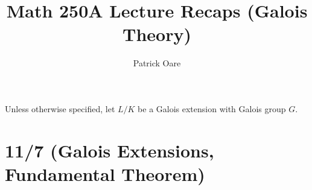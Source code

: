 \documentclass[11pt, oneside]{amsart}   	%
\title{Math 250A Lecture Recaps (Galois Theory)}
\author{Patrick Oare}
\theoremstyle{definition}
\begin{document}
\maketitle

Unless otherwise specified, let $L / K$ be a Galois extension with Galois group $G$.

\section{11/7 (Galois Extensions, Fundamental Theorem)}
\end{document}
